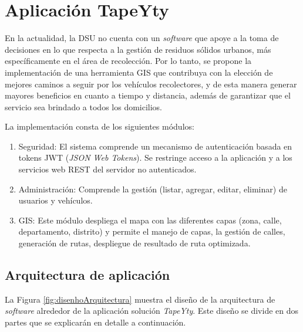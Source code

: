 \chapter{Aplicación TapeYty}
\label{solucionpropuesta}
\ifpdf
  \graphicspath{{Chapter6/Chapter6Figs/PNG/}{Chapter6/Chapter6Figs/PDF/}{Chapter6/Chapter6Figs/}}
\else
  \graphicspath{{Chapter6/Chapter6Figs/EPS/}{Chapter6/Chapter6Figs/}}
\fi


En la actualidad, la DSU no cuenta con un \textit{software} que apoye a la toma de decisiones en lo que respecta a la gestión de residuos sólidos urbanos, más específicamente en el área de recolección. Por lo tanto, se propone la implementación de una herramienta GIS que contribuya con la elección de mejores caminos a seguir por los vehículos recolectores, y de esta manera generar mayores beneficios en cuanto a tiempo y distancia, además de garantizar que el servicio sea brindado a todos los domicilios.

La implementación consta de los siguientes módulos:
\begin{enumerate}
    \item Seguridad: El sistema comprende un mecanismo de autenticación basada en tokens JWT (\textit{JSON Web Tokens}). Se restringe acceso a la aplicación y a los servicios web REST del servidor no autenticados.
    \item Administración: Comprende la gestión (listar, agregar, editar, eliminar) de usuarios y vehículos.
    \item GIS: Este módulo despliega el mapa con las diferentes capas (zona, calle, departamento, distrito) y permite el manejo de capas, la gestión de calles, generación de rutas, despliegue de resultado de ruta optimizada.
\end{enumerate}

\section{Arquitectura de aplicación}

La Figura \ref{fig:disenhoArquitectura} muestra el diseño de la arquitectura de \textit{software} alrededor de la aplicación solución \textit{TapeYty}. Este diseño se divide en dos partes que se explicarán en detalle a continuación.

